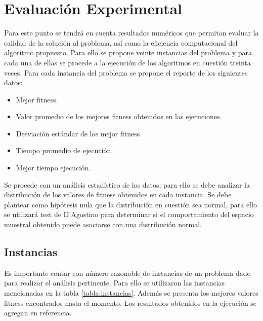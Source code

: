 \documentclass[journal]{IEEEtran}
\begin{document}
\section{Evaluación Experimental}
Para este punto se tendrá en cuenta resultados numéricos que permitan evaluar la calidad de la solución al problema, así como la eficiencia computacional del algoritmo propuesto.
Para ello se propone veinte instancias del problema y para cada una de ellas se procede a la ejecución de los algoritmos en cuestión treinta veces.
Para cada instancia del problema se propone el reporte de los siguientes datos:
\begin{itemize}
  \item Mejor fitness.
  \item Valor promedio de los mejores fitness obtenidos en las ejecuciones.
  \item Desviación estándar de los mejor fitness.
  \item Tiempo promedio de ejecución.
  \item Mejor tiempo ejecución.
\end{itemize}

Se procede con un análisis estadístico de los datos, para ello se debe analizar la distribución de los valores de fitness obtenidos en cada instancia. Se debe plantear como hipótesis nula que la distribución en cuestión sea normal, para ello se utilizará test de D'Agostino para determinar si el comportamiento del espacio muestral obtenido puede asociarse con una distribución normal.

\subsection{Instancias}
Es importante contar con número razonable de instancias de un problema dado para realizar el análisis pertinente.
Para ello se utilizaron las instancias mencionadas en la tabla \ref{tabla:instancias}. Además se presenta los mejores valores fitness encontrados hasta el momento\cite{url:bestsol}.
Los resultados obtenidos en la ejecución se agregan en referencia.\cite{url:casos}
\end{document}
